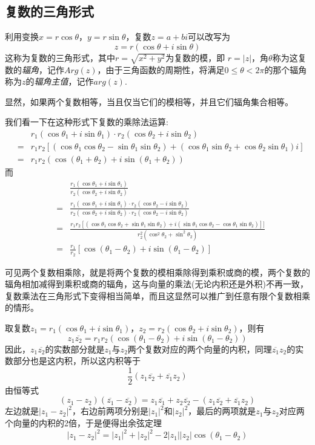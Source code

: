 \subsection{复数的三角形式}
\label{sec:triangle-form-of-complex-number}



利用变换$x=r\cos{\theta}$，$y=r\sin{\theta}$，复数$z=a+bi$可以改写为
\[ z=r(\cos{\theta}+i\sin{\theta}) \]
这称为复数的三角形式，其中$r=\sqrt{x^2+y^2}$为复数的模，即 $r=|z|$，角$\theta$称为这复数的\emph{辐角}，记作$Arg(z)$，由于三角函数的周期性，将满足$0\leqslant \theta < 2\pi$的那个辐角称为$z$的\emph{辐角主值}，记作$arg(z)$.

显然，如果两个复数相等，当且仅当它们的模相等，并且它们辐角集合相等。

我们看一下在这种形式下复数的乘除法运算:
\begin{eqnarray*}
  &&  r_1(\cos{\theta_1}+i\sin{\theta_1}) \cdot r_2(\cos{\theta_2}+i\sin{\theta_2}) \\
  & = & r_1r_2[(\cos{\theta_1}\cos{\theta_2}-\sin{\theta_1}\sin{\theta_2})+(\cos{\theta_1}\sin{\theta_2}+\cos{\theta_2}\sin{\theta_1})i] \\
  & = & r_1r_2(\cos{(\theta_1+\theta_2)}+i\sin{(\theta_1+\theta_2)})
\end{eqnarray*}
而
\begin{eqnarray*}
  &&  \frac{r_1(\cos{\theta_1}+i\sin{\theta_1})}{r_2(\cos{\theta_2}+i\sin{\theta_2})} \\
  & = & \frac{r_1(\cos{\theta_1}+i\sin{\theta_1}) \cdot r_2(\cos{\theta_2}-i\sin{\theta_2})}{r_2(\cos{\theta_2}+i\sin{\theta_2}) \cdot r_2(\cos{\theta_2}-i\sin{\theta_2})} \\
  & = & \frac{r_1r_2[(\cos{\theta_1}\cos{\theta_2}+\sin{\theta_1}\sin{\theta_2})+i(\sin{\theta_1}\cos{\theta_2}-\cos{\theta_1}\sin{\theta_2})]]}{r_2^2(\cos^2{\theta_2}+\sin^2{\theta_2})} \\
  & = & \frac{r_1}{r_2}[\cos{(\theta_1-\theta_2)+i\sin{(\theta_1-\theta_2)}}]
\end{eqnarray*}

可见两个复数相乘除，就是将两个复数的模相乘除得到乘积或商的模，两个复数的辐角相加减得到乘积或商的辐角，这与向量的乘法(无论内积还是外积)不再一致，复数乘法在三角形式下变得相当简单，而且这显然可以推广到任意有限个复数相乘的情形。

\begin{example}[利用共轭复数证明余弦定理]
  取复数$z_1=r_1(\cos{\theta_1}+i\sin{\theta_1})$，$z_2=r_2(\cos{\theta_2}+i\sin{\theta_2})$，则有
  \[ z_1\overline{z_2} = r_1r_2(\cos{(\theta_1-\theta_2)+i\sin{(\theta_1-\theta_2)}}) \]
  因此，$z_1\overline{z_2}$的实数部分就是$z_1$与$z_2$两个复数对应的两个向量的内积，同理$\overline{z_1}z_2$的实数部分也是这内积，所以这内积等于
  \[ \frac{1}{2}(z_1\overline{z_2}+\overline{z_1}z_2) \]
  由恒等式
  \[ (z_1-z_2)(\overline{z_1}-\overline{z_2})= z_1\overline{z_1} + z_2\overline{z_2} -(z_1\overline{z_2}+\overline{z_1}z_2) \]
  左边就是$|z_1-z_2|^2$，右边前两项分别是$|z_1|^2$和$|z_2|^2$，最后的两项就是$z_1$与$z_2$对应两个向量的内积的2倍，于是便得出余弦定理
  \[ |z_1-z_2|^2 = |z_1|^2+|z_2|^2-2|z_1||z_2|\cos{(\theta_1-\theta_2)} \]
\end{example}

